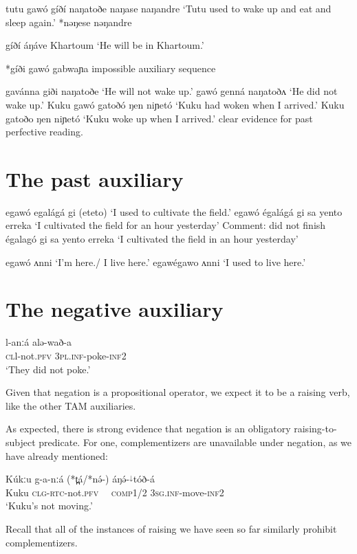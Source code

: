 tutu gawó gíðí naŋatoðe naŋase naŋandre	‘Tutu used to wake up and eat and sleep again.’
			  *nəŋese nəŋandre

gíðí áŋáve Khartoum		‘He will be in Khartoum.’

*gíði gawó gabwaɲa		 impossible auxiliary sequence

gavánna giði naŋatoðe			‘He will not wake up.’
gawó genná naŋatoðʌ			‘He did not wake up.’
Kuku gawó gatoðó ŋen niɲetó		‘Kuku had woken when I arrived.’
Kuku gatoðo ŋen niɲetó		‘Kuku woke up when I arrived.’
			 clear evidence for past perfective reading.
 

\section{The past auxiliary}\label{sec:ch14:pstipfv}

egawó egalágá gi (eteto)		‘I used to cultivate the field.’
egawó égalágá gi sa yento erreka	‘I cultivated the field for an hour yesterday’
					Comment: did not finish
égalagó gi sa yento erreka		‘I cultivated the field in an hour yesterday’

egawó ʌnni				‘I’m here./ I live here.’
egawégawo ʌnni			‘I used to live here.’



\section{The negative auxiliary}\label{sec:ch14:negaux}

\ea \gll  	l-anːá               alə-wað-a	\\
\textsc{cl}l-not.\textsc{pfv}   \textsc{3pl.inf}-poke-\textsc{inf2}\\
\glt ‘They did not poke.’
\z 

Given that negation is a propositional operator, we expect it to be a raising verb, like the other TAM auxiliaries. 

As expected, there is strong evidence that negation is an obligatory raising-to-subject predicate. For one, complementizers are unavailable under negation, as we have already mentioned: 

\ea \gll  Kúkːu g-a-nːá (*t̪á/*nə́-) áŋə́-$^{↓}$tóð-á\\
Kuku \textsc{clg}-\textsc{rtc}-not.\textsc{pfv}   {\ \ \textsc{comp1/2}} \textsc{3sg.inf}-move-\textsc{inf2}\\
\glt ‘Kuku’s not moving.’
\z 

Recall that all of the instances of raising we have seen so far similarly prohibit complementizers.

